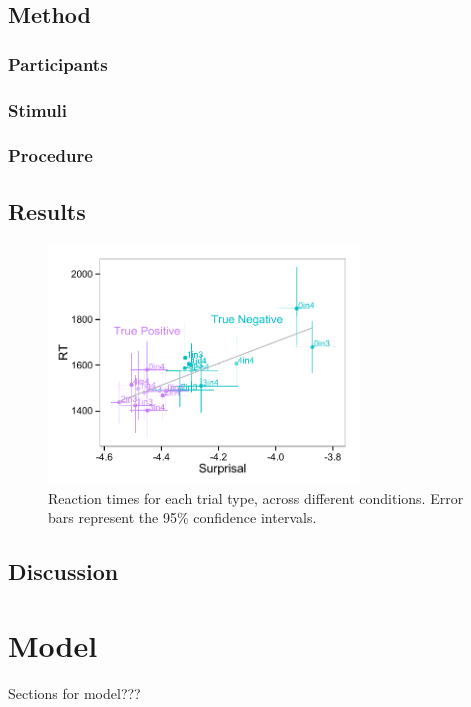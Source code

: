 \documentclass[10pt,letterpaper]{article}
\begin{document}
\subsection{Method}

\subsubsection{Participants}

\subsubsection{Stimuli}

\subsubsection{Procedure}

\subsection{Results}
\begin{figure}
\begin{center} 
\includegraphics[width=3.25in]{figures/speakerstudy_comparison.pdf}
\caption{\label{fig:addition_subs} Reaction times for each trial type, across different conditions.  Error bars represent the 95\% confidence intervals.}
\end{center} 
\end{figure}

\subsection{Discussion}

\section{Model}
Sections for model???
\end{document}
